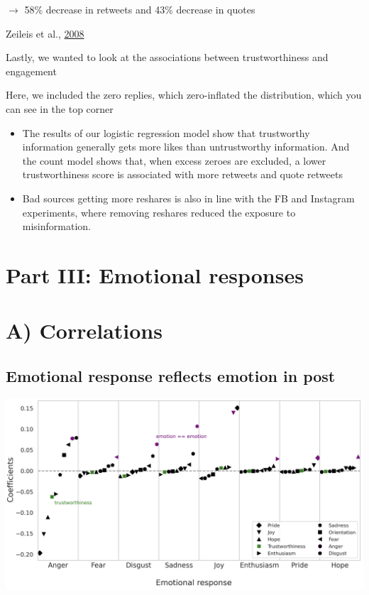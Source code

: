 \documentclass[
  letterpaper,
  DIV=11,
  numbers=noendperiod]{scrartcl}
\begin{document}
\(\rightarrow\) 58\% decrease in retweets and 43\% decrease in quotes

Zeileis et al., \href{http://www.jstatsoft.org/v27/i08/}{2008}

Lastly, we wanted to look at the associations between trustworthiness
and engagement

Here, we included the zero replies, which zero-inflated the
distribution, which you can see in the top corner

\begin{itemize}
\item
  The results of our logistic regression model show that trustworthy
  information generally gets more likes than untrustworthy information.
  And the count model shows that, when excess zeroes are excluded, a
  lower trustworthiness score is associated with more retweets and quote
  retweets
\item
  Bad sources getting more reshares is also in line with the FB and
  Instagram experiments, where removing reshares reduced the exposure to
  misinformation.
\end{itemize}

\hypertarget{part-iii-emotional-responses}{%
\section{Part III: Emotional
responses}\label{part-iii-emotional-responses}}

\hypertarget{a-correlations}{%
\section{A) Correlations}\label{a-correlations}}

\hypertarget{emotional-response-reflects-emotion-in-post}{%
\subsection{Emotional response reflects emotion in
post}\label{emotional-response-reflects-emotion-in-post}}

\includegraphics[width=9.375in,height=\textheight]{images/emo_coeffs.png}
\end{document}
